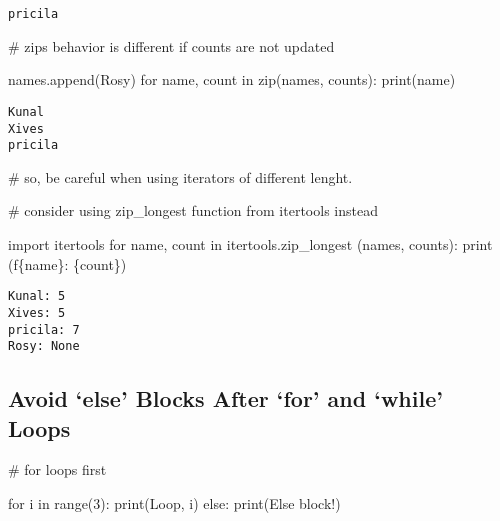 \documentclass[
]{report}
\newenvironment{Shaded}{\begin{snugshade}}{\end{snugshade}}
\newcommand{\BuiltInTok}[1]{\textcolor[rgb]{0.00,0.23,0.31}{#1}}
\newcommand{\CommentTok}[1]{\textcolor[rgb]{0.37,0.37,0.37}{#1}}
\newcommand{\ControlFlowTok}[1]{\textcolor[rgb]{0.00,0.23,0.31}{#1}}
\newcommand{\DecValTok}[1]{\textcolor[rgb]{0.68,0.00,0.00}{#1}}
\newcommand{\ImportTok}[1]{\textcolor[rgb]{0.00,0.46,0.62}{#1}}
\newcommand{\KeywordTok}[1]{\textcolor[rgb]{0.00,0.23,0.31}{#1}}
\newcommand{\NormalTok}[1]{\textcolor[rgb]{0.00,0.23,0.31}{#1}}
\newcommand{\SpecialCharTok}[1]{\textcolor[rgb]{0.37,0.37,0.37}{#1}}
\newcommand{\SpecialStringTok}[1]{\textcolor[rgb]{0.13,0.47,0.30}{#1}}
\newcommand{\StringTok}[1]{\textcolor[rgb]{0.13,0.47,0.30}{#1}}
\begin{document}
\begin{verbatim}
pricila
\end{verbatim}

\begin{Shaded}
\begin{Highlighting}[]
\CommentTok{\# zip\textquotesingle{}s behavior is different if counts are not updated}

\NormalTok{names.append(}\StringTok{\textquotesingle{}Rosy\textquotesingle{}}\NormalTok{)}
\ControlFlowTok{for}\NormalTok{ name, count }\KeywordTok{in} \BuiltInTok{zip}\NormalTok{(names, counts):}
    \BuiltInTok{print}\NormalTok{(name)}
\end{Highlighting}
\end{Shaded}

\begin{verbatim}
Kunal
Xives
pricila
\end{verbatim}

\begin{Shaded}
\begin{Highlighting}[]
\CommentTok{\# so, be careful when using iterators of different lenght. }

\CommentTok{\# consider using zip\_longest function from itertools instead}

\ImportTok{import}\NormalTok{ itertools}
\ControlFlowTok{for}\NormalTok{ name, count }\KeywordTok{in}\NormalTok{ itertools.zip\_longest (names, counts):}
    \BuiltInTok{print}\NormalTok{ (}\SpecialStringTok{f\textquotesingle{}}\SpecialCharTok{\{}\NormalTok{name}\SpecialCharTok{\}}\SpecialStringTok{: }\SpecialCharTok{\{}\NormalTok{count}\SpecialCharTok{\}}\SpecialStringTok{\textquotesingle{}}\NormalTok{)}
\end{Highlighting}
\end{Shaded}

\begin{verbatim}
Kunal: 5
Xives: 5
pricila: 7
Rosy: None
\end{verbatim}

\hypertarget{avoid-else-blocks-after-for-and-while-loops}{%
\subsection{Avoid `else' Blocks After `for' and `while'
Loops}\label{avoid-else-blocks-after-for-and-while-loops}}

\begin{Shaded}
\begin{Highlighting}[]
\CommentTok{\# for loops first}

\ControlFlowTok{for}\NormalTok{ i }\KeywordTok{in} \BuiltInTok{range}\NormalTok{(}\DecValTok{3}\NormalTok{):}
    \BuiltInTok{print}\NormalTok{(}\StringTok{\textquotesingle{}Loop\textquotesingle{}}\NormalTok{, i)}
\ControlFlowTok{else}\NormalTok{:}
    \BuiltInTok{print}\NormalTok{(}\StringTok{\textquotesingle{}Else block!\textquotesingle{}}\NormalTok{)}
\end{Highlighting}
\end{Shaded}
\end{document}
